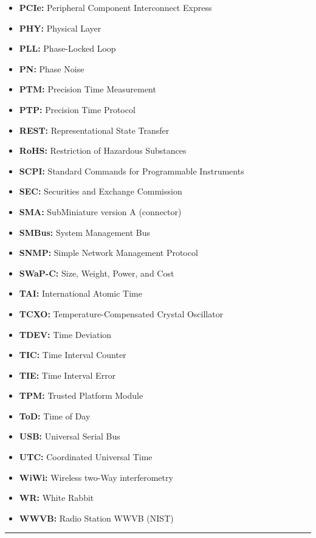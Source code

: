 \begin{itemize}
  \textbf{OCXO:} Oven-Controlled Crystal Oscillator
\item
  \textbf{PCIe:} Peripheral Component Interconnect Express
\item
  \textbf{PHY:} Physical Layer
\item
  \textbf{PLL:} Phase-Locked Loop
\item
  \textbf{PN:} Phase Noise
\item
  \textbf{PTM:} Precision Time Measurement
\item
  \textbf{PTP:} Precision Time Protocol
\item
  \textbf{REST:} Representational State Transfer
\item
  \textbf{RoHS:} Restriction of Hazardous Substances
\item
  \textbf{SCPI:} Standard Commands for Programmable Instruments
\item
  \textbf{SEC:} Securities and Exchange Commission
\item
  \textbf{SMA:} SubMiniature version A (connector)
\item
  \textbf{SMBus:} System Management Bus
\item
  \textbf{SNMP:} Simple Network Management Protocol
\item
  \textbf{SWaP-C:} Size, Weight, Power, and Cost
\item
  \textbf{TAI:} International Atomic Time
\item
  \textbf{TCXO:} Temperature-Compensated Crystal Oscillator
\item
  \textbf{TDEV:} Time Deviation
\item
  \textbf{TIC:} Time Interval Counter
\item
  \textbf{TIE:} Time Interval Error
\item
  \textbf{TPM:} Trusted Platform Module
\item
  \textbf{ToD:} Time of Day
\item
  \textbf{USB:} Universal Serial Bus
\item
  \textbf{UTC:} Coordinated Universal Time
\item
  \textbf{WiWi:} Wireless two-Way interferometry
\item
  \textbf{WR:} White Rabbit
\item
  \textbf{WWVB:} Radio Station WWVB (NIST)
\end{itemize}

\begin{center}\rule{0.5\linewidth}{0.5pt}\end{center}

